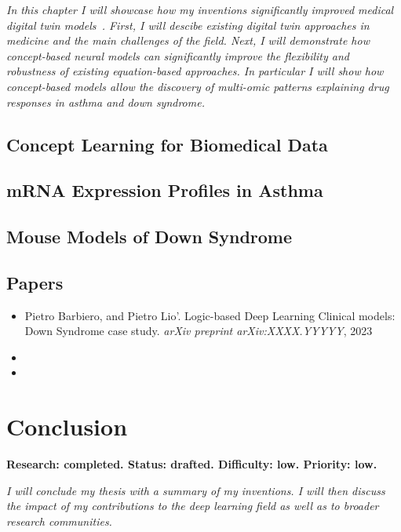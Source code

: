 \documentclass[withindex,glossary]{cam-thesis}
\theoremstyle{plain}
\theoremstyle{definition}
\theoremstyle{remark}
\begin{document}
\textit{In this chapter I will showcase how my inventions significantly improved medical digital twin models~\citep{laubenbacher2021using}. First, I will descibe existing digital twin approaches in medicine and the main challenges of the field. Next, I will demonstrate how concept-based neural models can significantly improve the flexibility and robustness of existing equation-based approaches. In particular I will show how concept-based models allow the discovery of multi-omic patterns explaining drug responses in asthma and down syndrome.}

\section{Concept Learning for Biomedical Data}

\section{mRNA Expression Profiles in Asthma}

\section{Mouse Models of Down Syndrome}


\section*{Papers}
\nobibliography*
\begin{itemize}
    \item Pietro Barbiero, and Pietro Lio'. Logic-based Deep Learning Clinical models: Down Syndrome case study. \textit{arXiv preprint arXiv:XXXX.YYYYY}, 2023
    \item {}
    \item {}
\end{itemize}


\chapter{Conclusion} \label{chapter:conclusion}
\textbf{Research: completed. Status: drafted. Difficulty: low. Priority: low.}

\textit{I will conclude my thesis with a summary of my inventions. I will then discuss the impact of my contributions to the deep learning field as well as to broader research communities.}
\end{document}
